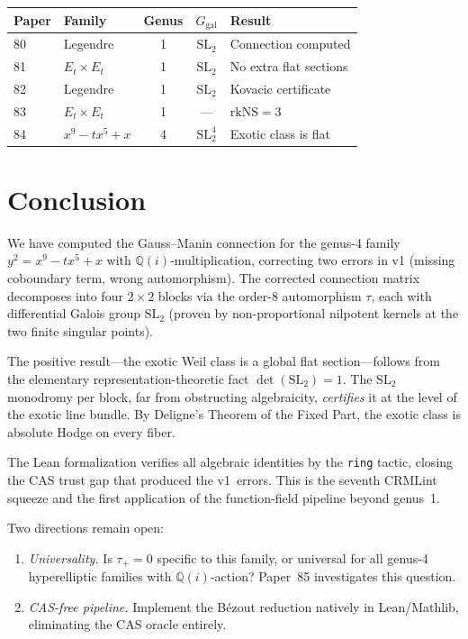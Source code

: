 \documentclass[11pt]{article}
\theoremstyle{plain}
\theoremstyle{definition}
\theoremstyle{remark}
\newcommand{\Q}{\mathbb{Q}}
\newcommand{\SL}{\mathrm{SL}}
\newcommand{\rk}{\mathrm{rk}}
\newcommand{\Ggal}{G_{\mathrm{gal}}}
\newcommand{\NS}{\mathrm{NS}}
\begin{document}
\begin{center}
\begin{tabular}{llccl}
\toprule
Paper & Family & Genus & $\Ggal$ & Result \\
\midrule
80 & Legendre & 1 & $\SL_2$ & Connection computed \\
81 & $E_t \times E_t$ & 1 & $\SL_2$ & No extra flat sections \\
82 & Legendre & 1 & $\SL_2$ & Kovacic certificate \\
83 & $E_t \times E_t$ & 1 & --- & $\rk \NS = 3$ \\
84 & $x^9 - tx^5 + x$ & 4 & $\SL_2^4$ & Exotic class is flat \\
\bottomrule
\end{tabular}
\end{center}

\section{Conclusion}\label{sec:conclusion}

We have computed the Gauss--Manin connection for the genus-4 family
$y^2 = x^9 - tx^5 + x$ with $\Q(i)$-multiplication, correcting two
errors in v1 (missing coboundary term, wrong automorphism). The
corrected connection matrix decomposes into four $2 \times 2$ blocks
via the order-8 automorphism $\tau$, each with differential Galois
group $\SL_2$ (proven by non-proportional nilpotent kernels at the
two finite singular points).

The positive result---the exotic Weil class is a global flat
section---follows from the elementary representation-theoretic fact
$\det(\SL_2) = 1$. The $\SL_2$ monodromy per block, far from
obstructing algebraicity, \emph{certifies} it at the level of the
exotic line bundle. By Deligne's Theorem of the Fixed Part, the
exotic class is absolute Hodge on every fiber.

The Lean formalization verifies all algebraic identities by the
\texttt{ring} tactic, closing the CAS trust gap that produced the
v1~errors. This is the seventh CRMLint squeeze and the first
application of the function-field pipeline beyond genus~1.

Two directions remain open:
\begin{enumerate}[nosep]
\item \emph{Universality.} Is $\tau_+ = 0$ specific to this family,
  or universal for all genus-4 hyperelliptic families with
  $\Q(i)$-action? Paper~85 investigates this question.
\item \emph{CAS-free pipeline.} Implement the B\'ezout reduction
  natively in Lean/Mathlib, eliminating the CAS oracle entirely.
\end{enumerate}
\end{document}
